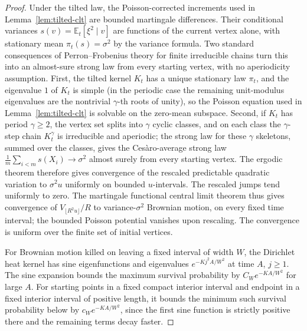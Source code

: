 \documentclass[11pt]{article}
\theoremstyle{definition}
\theoremstyle{remark}
\begin{document}
\begin{proof}
Under the tilted law, the Poisson-corrected increments used in
Lemma~\ref{lem:tilted-clt} are bounded martingale differences.
Their conditional variances $s(v)=\mathbb E_t[\xi^2\mid v]$ are
functions of the current vertex alone, with stationary mean
$\pi_t(s)=\sigma^2$ by the variance formula. Two standard
consequences of Perron--Frobenius theory for finite irreducible
chains turn this into an almost-sure strong law from every
starting vertex, with no aperiodicity assumption. First, the
tilted kernel $K_t$ has a unique stationary law $\pi_t$, and
the eigenvalue $1$ of $K_t$ is simple (in the periodic case the
remaining unit-modulus eigenvalues are the nontrivial
$\gamma$-th roots of unity), so the Poisson equation used in
Lemma~\ref{lem:tilted-clt} is solvable on the zero-mean
subspace. Second, if $K_t$ has period $\gamma\ge2$, the vertex
set splits into $\gamma$ cyclic classes, and on each class the
$\gamma$-step chain $K_t^{\gamma}$ is irreducible and
aperiodic; the strong law for these $\gamma$ skeletons, summed
over the classes, gives the Ces\`aro-average strong law
$\frac1m\sum_{i<m}s(X_i)\to\sigma^2$ almost surely from every
starting vertex. The ergodic theorem therefore gives convergence
of the rescaled
predictable quadratic variation to $\sigma^2 u$ uniformly
on bounded $u$-intervals. The rescaled jumps tend uniformly
to zero. The martingale functional central limit theorem
\cite[Theorem~2.1(ii)]{WhittFCLT} thus gives convergence of
$V_{\lfloor R^2 u\rfloor}/R$ to variance-$\sigma^2$ Brownian
motion, on every fixed time interval; the bounded Poisson
potential vanishes upon rescaling. The convergence is uniform
over the finite set of initial vertices.

For Brownian motion killed on leaving a fixed interval of
width $W$, the Dirichlet heat kernel has sine eigenfunctions
and eigenvalues $e^{-Kj^2 A/W^2}$ at time $A$, $j\ge1$.
The sine expansion bounds the maximum survival probability
by $C_W e^{-KA/W^2}$ for large $A$.
For starting points in a fixed compact interior interval
and endpoint in a fixed interior interval of positive length,
it bounds the minimum such survival probability below by
$c_W e^{-KA/W^2}$, since the first sine function is
strictly positive there and the remaining terms decay faster.


\end{proof}
\end{document}

